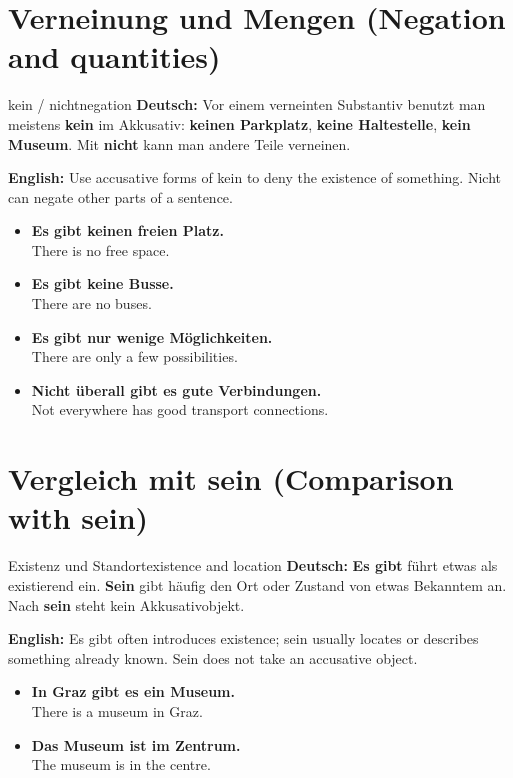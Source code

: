 \documentclass[a4paper,11pt]{article}
\newcommand{\GermanText}[1]{\textbf{Deutsch: }#1\par}
\newcommand{\EnglishText}[1]{{\small\color{SoftGray}\textbf{English: }#1\par}}
\newcommand{\ExampleItem}[2]{\item \textbf{#1}\\{\small\color{SoftGray}#2}}
\begin{document}
   \section{Verneinung und Mengen (Negation and quantities)}
                  \begin{grammarentry}{kein / nicht}{negation}
                     \GermanText{Vor einem verneinten Substantiv benutzt man meistens \textbf{kein} im Akkusativ: \textbf{keinen Parkplatz}, \textbf{keine Haltestelle}, \textbf{kein Museum}. Mit \textbf{nicht} kann man andere Teile verneinen.}
                     \EnglishText{Use accusative forms of kein to deny the existence of something. Nicht can negate other parts of a sentence.}
                  \end{grammarentry}
                  \begin{exbox}\begin{itemize}
                     \ExampleItem{Es gibt keinen freien Platz.}{There is no free space.}
                     \ExampleItem{Es gibt keine Busse.}{There are no buses.}
                     \ExampleItem{Es gibt nur wenige Möglichkeiten.}{There are only a few possibilities.}
                     \ExampleItem{Nicht überall gibt es gute Verbindungen.}{Not everywhere has good transport connections.}
                     \end{itemize}\end{exbox}
   \section{Vergleich mit sein (Comparison with sein)}
                     \begin{grammarentry}{Existenz und Standort}{existence and location}
                        \GermanText{\textbf{Es gibt} führt etwas als existierend ein. \textbf{Sein} gibt häufig den Ort oder Zustand von etwas Bekanntem an. Nach \textbf{sein} steht kein Akkusativobjekt.}
                        \EnglishText{Es gibt often introduces existence; sein usually locates or describes something already known. Sein does not take an accusative object.}
                     \end{grammarentry}
                     \begin{exbox}\begin{itemize}
                        \ExampleItem{In Graz gibt es ein Museum.}{There is a museum in Graz.}
                        \ExampleItem{Das Museum ist im Zentrum.}{The museum is in the centre.}
                        \end{itemize}\end{exbox}
\end{document}
